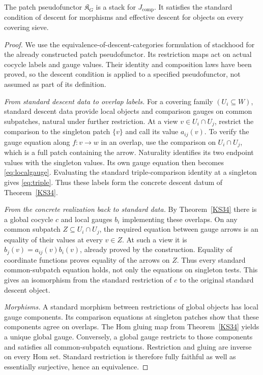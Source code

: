 \begin{theorem}\label{KS36}
The patch pseudofunctor \(\mathfrak K_G\) is a stack for \(J_{\mathrm{comp}}\). It satisfies the standard condition of descent for morphisms and effective descent for objects on every covering sieve.
\end{theorem}
\begin{proof}
We use the equivalence-of-descent-categories formulation of stackhood for the already constructed patch pseudofunctor. Its restriction maps act on actual cocycle labels and gauge values. Their identity and composition laws have been proved, so the descent condition is applied to a specified pseudofunctor, not assumed as part of its definition.

\emph{From standard descent data to overlap labels.} For a covering family $(U_i\subseteq W)$, standard descent data provide local objects and comparison gauges on common subpatches, natural under further restriction. At a view $v\in U_i\cap U_j$, restrict the comparison to the singleton patch $\{v\}$ and call its value $a_{ij}(v)$. To verify the gauge equation along $f:v\to w$ in an overlap, use the comparison on $U_i\cap U_j$, which is a full patch containing the arrow. Naturality identifies its two endpoint values with the singleton values. Its own gauge equation then becomes \eqref{eq:localgauge}. Evaluating the standard triple-comparison identity at a singleton gives \eqref{eq:triple}. Thus these labels form the concrete descent datum of Theorem~\ref{KS34}.

\emph{From the concrete realization back to standard data.} By Theorem~\ref{KS34} there is a global cocycle $c$ and local gauges $b_i$ implementing these overlaps. On any common subpatch $Z\subseteq U_i\cap U_j$, the required equation between gauge arrows is an equality of their values at every $v\in Z$. At such a view it is $b_j(v)=a_{ij}(v)b_i(v)$, already proved by the construction. Equality of coordinate functions proves equality of the arrows on $Z$. Thus every standard common-subpatch equation holds, not only the equations on singleton tests. This gives an isomorphism from the standard restriction of $c$ to the original standard descent object.

\emph{Morphisms.} A standard morphism between restrictions of global objects has local gauge components. Its comparison equations at singleton patches show that these components agree on overlaps. The Hom gluing map from Theorem~\ref{KS34} yields a unique global gauge. Conversely, a global gauge restricts to those components and satisfies all common-subpatch equations. Restriction and gluing are inverse on every Hom set. Standard restriction is therefore fully faithful as well as essentially surjective, hence an equivalence.


\end{proof}
